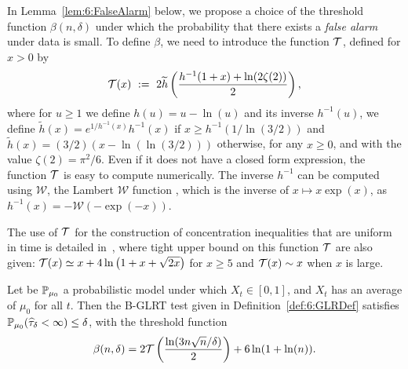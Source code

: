 In Lemma~\ref{lem:6:FalseAlarm} below, we propose a choice of the threshold function $\beta(n,\delta)$ under which the probability that there exists a \emph{false alarm} under \iid{} data is small. To define $\beta$, we need to introduce the function $\mathcal{T}$, defined for $x>0$ by
%
\begin{equation}\label{def:6:function_T}
    \mathcal{T}(x) ~:=~ 2 \widetilde{h}\left(\frac{h^{-1}(1+x) + \ln(2\zeta(2))}{2}\right),
\end{equation}
where for $u \ge 1$ we define $h(u) = u - \ln(u)$ and its inverse $h^{-1}(u)$,
%
we define $\widetilde{h}(x) = e^{1/h^{-1}(x)} h^{-1}(x)$ if $x \ge h^{-1}(1/\ln (3/2))$ and $\tilde{h}(x) = (3/2) (x-\ln(\ln (3/2)))$ otherwise, for any $x \ge 0$,
and with the value $\zeta(2) = \pi^2 / 6$.
%
Even if it does not have a closed form expression, the function $\mathcal{T}$ is easy to compute numerically.
%
The inverse $h^{-1}$ can be computed using $\mathcal{W}$, the Lambert $\mathcal{W}$ function \cite{Corless96}, which is the inverse of $x \mapsto x \exp(x)$, as $h^{-1}(x) = - \mathcal{W}(- \exp(-x))$.

The use of $\mathcal{T}$ for the construction of concentration inequalities that are uniform in time is detailed in~\cite{KK18Martingales}, where tight upper bound on this function $\mathcal{T}$ are also given:
$\mathcal{T} (x) \simeq x + 4 \ln\big(1 + x + \sqrt{2x}\big)$ for $x\geq 5$ and $\mathcal{T}(x) \sim x$ when $x$ is large.

\begin{lemma}\label{lem:6:FalseAlarm}
    Let be $\mathbb{P}_{\mu_0}$ a probabilistic model under which $X_t \in [0,1]$, and $X_t$ has an average of $\mu_0$ for all $t$.
    Then the B-GLRT test given in Definition~\ref{def:6:GLRDef} satisfies
    $\mathbb{P}_{\mu_0}(\widehat{\tau}_\delta < \infty) \leq \delta$, with the threshold function
    \begin{equation}\label{def:6:beta}
        \beta(n,\delta) = 2\mathcal{T}\left(\frac{\ln(3n\sqrt{n}/\delta)}{2}\right) + 6\ln(1+\ln(n)).
    \end{equation}
\end{lemma}

